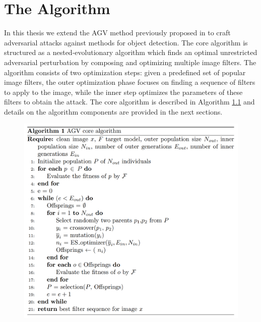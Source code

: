 \chapter{The Algorithm} \label{sec:algorithm}

In this thesis we extend the AGV method previously proposed in \cite{AGV-evoapps,AGV-wiiat} to craft adversarial attacks against methods for object detection. The core algorithm is structured as a nested-evolutionary algorithm which finds an optimal unrestricted adversarial perturbation by composing and optimizing multiple image filters. The algorithm consists of two optimization steps: given a predefined set of popular image filters, the outer optimization phase focuses on finding a sequence of filters to apply to the image, while the inner step optimizes the parameters of these filters to obtain the attack. The core algorithm is described in Algorithm \ref{agv_core} and details on the algorithm components are provided in the next sections.


\begin{figure}[]
\centering
    \includegraphics[width=1.0\textwidth]{Attack/charts/agv_alg.png}
    \caption{}
    \label{agv_core}
     
\end{figure}

